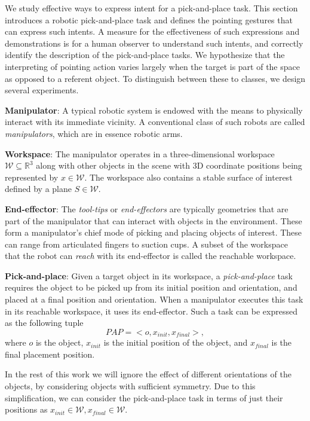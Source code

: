 We study effective ways to express intent for a pick-and-place task. This section introduces a robotic pick-and-place task and defines the pointing gestures that can express such intents. A measure for the effectiveness of such expressions and demonstrations is for a human observer to understand such intents, and correctly identify the description of the pick-and-place tasks. We hypothesize that the interpreting of pointing action varies largely when the target is part of the space as opposed to a referent object. To distinguish between these to classes, we design several experiments.
 
\noindent\textbf{Manipulator}: A typical robotic system is endowed with the means to physically interact with its immediate vicinity. A conventional class of such robots are called \textit{manipulators}, which are in essence robotic arms. 


\noindent\textbf{Workspace}: The manipulator operates in a three-dimensional workspace 
$\mathcal{W}\subseteq \mathbb{R}^3$ along with other objects in the scene with 3D coordinate positions being represented by $x\in\mathcal{W}$. The workspace also contains a stable surface of interest defined by a plane $S\in\mathcal{W}$. 

\noindent\textbf{End-effector}: The \textit{tool-tips} or \textit{end-effectors} are typically geometries that are part of the manipulator that can interact with objects in the environment. These form a manipulator's chief mode of picking and placing objects of interest. These can range from articulated fingers to suction cups. A subset of the workspace that the robot can \textit{reach} with its end-effector is called the reachable workspace. 

\noindent\textbf{Pick-and-place}: Given a target object in its workspace, a \textit{pick-and-place} task requires the object to be picked up from its initial position and orientation, and placed at a final position and orientation. When a manipulator executes this task in its reachable workspace, it uses its end-effector. Such a task can be expressed as the following tuple
$$ PAP = < o, x_{init}, x_{final} >, $$
where $o$ is the object, $x_{init}$ is the initial position of the object, and $x_{final}$ is the final placement position. 

In the rest of this work we will ignore the effect of different orientations of the objects, by considering objects with sufficient symmetry. Due to this simplification, we can consider the pick-and-place task in terms of just their positions as $x_{init}\in\mathcal{W}, x_{final}\in\mathcal{W}$.

